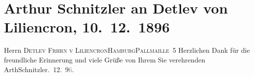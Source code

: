 

         
         \renewcommand{\erwaehntePersonen}{Personen: Detlev von Liliencron}
         \renewcommand{\erwaehnteOrte}{Orte: Altona, Hamburg, IX., Alsergrund, Palmaille, Wien}
         \renewcommand{\erwaehnteWerke}{}
               \section[Arthur Schnitzler an Detlev von Liliencron, 10. 12. 1896]{ Arthur Schnitzler an Detlev von Liliencron, 10. 12. 1896}\nopagebreak{}\rehead{ }\begin{ledgroupsized}[t]{13cm}\normalsize\beginnumbering{} \toendnotes[C]{\smallbreak\pagebreak[2]} 
\pstart{}{\pb}Herrn \textsc{Detlev Frhrn v
                     Liliencron}\pend{}\pstart{}\textsc{Hamburg}\pend{}\pstart{}\textsc{Pallmaille 5}\pend{}{\bigskip}\pstart
           \noindent{}{\pb}Herzlichen Dank für die freundliche Erinnerung und
               viele Grüße von Ihrem Sie verehrenden\pend
           \pstart \spacefill\mbox{ArthSchnitzler}\pend{}. 12. 9\textcolor{gray}{6}. \pend
           
         
         \endnumbering{}\end{ledgroupsized}  \newcommand{\dateiname}{L00627}\newcommand{\titel}{Arthur Schnitzler an Detlev von Liliencron, 10. 12. 1896}\newcommand{\editorInnen}{Martin Anton Müller und Gerd-Hermann Susen}
      